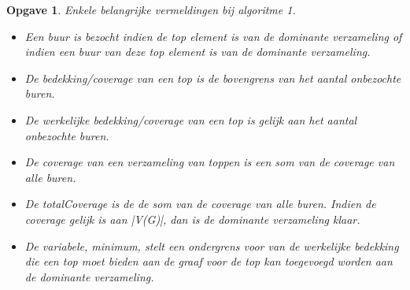 \documentclass[11pt, a4paper]{article}
\newtheorem{opgave}{Opgave}
\begin{document}
\begin{opgave}
		Enkele belangrijke vermeldingen bij algoritme 1. 
		\begin{itemize}
		\item Een buur is bezocht indien de top element is van de dominante verzameling of indien een buur van deze top element is van de dominante verzameling.
		\item De bedekking/coverage van een top is de bovengrens van het aantal onbezochte buren.
		\item De werkelijke bedekking/coverage van een top is gelijk aan het aantal onbezochte buren. 
		\item De coverage van een verzameling van toppen is een som van de coverage van alle buren.
		\item De totalCoverage is de de som van de coverage van alle buren. Indien de coverage gelijk is aan |V(G)|, dan is de dominante verzameling klaar. 
		\item De variabele, minimum, stelt een ondergrens voor van de werkelijke bedekking die een top moet bieden aan de graaf voor de top kan toegevoegd worden aan de dominante verzameling.
		\end{itemize}
		

\end{opgave}
\end{document}

